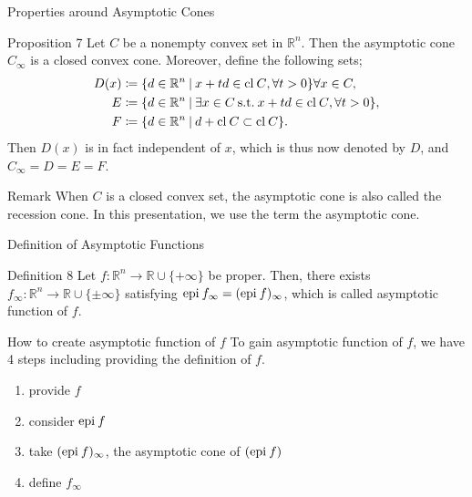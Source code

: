 \documentclass[aspectratio=169, dvipdfmx, 11pt]{beamer}
\newcommand{\RealNumberSet}{\mathbb{R}}
\newcommand{\NDemenstionalRealEuclideanSpace}{\mathbb{R}^n}
\newcommand{\Closure}[1]{\text{\rm cl\:${#1}$}} %
\newcommand{\Epigraph}[1]{\text{\rm epi\:${#1}$}} %
\newcommand{\SuchThat}{\:\text{s.t.}\:}
\newcommand{\SetForm}[2]{
  \{{#1}\:|\:{#2}\}
}
\begin{document}
\begin{frame}{Properties around Asymptotic Cones}
  \begin{block}{Proposition 7}
    Let $C$ be a nonempty convex set in $\NDemenstionalRealEuclideanSpace$. Then the asymptotic cone $C_{\infty}$ is a closed convex cone. Moreover, define the following sets;
    \begin{align}
      D(x) &\coloneqq \SetForm{d \in \NDemenstionalRealEuclideanSpace}{x+td \in \Closure{C}, \forall t > 0} \forall x \in C, \notag \\
      E &\coloneqq \SetForm{d \in \NDemenstionalRealEuclideanSpace}{\exists x \in C \SuchThat x+td \in \Closure{C}, \forall t > 0}, \notag \\
      F &\coloneqq \SetForm{d \in \NDemenstionalRealEuclideanSpace}{d + \Closure{C} \subset \Closure{C}}. \notag
    \end{align}
    Then $D(x)$ is in fact independent of $x$, which is thus now denoted by $D$, and $C_{\infty} = D = E = F$.
  \end{block}

  \begin{alertblock}{Remark}
    When $C$ is a closed convex set, the asymptotic cone is also called the recession cone. In this presentation, we use the term the asymptotic cone.
  \end{alertblock}
\end{frame}

\begin{frame}{Definition of Asymptotic Functions}
  \begin{block}{Definition 8}
    Let $f: \NDemenstionalRealEuclideanSpace \rightarrow \RealNumberSet \cup \{+\infty\}$ be proper. Then, there exists $f_{\infty}: \NDemenstionalRealEuclideanSpace \rightarrow \RealNumberSet \cup \{\pm\infty\}$ satisfying $\Epigraph{f_{\infty}} = (\Epigraph{f})_{\infty}$, which is called asymptotic function of $f$.
  \end{block}

  \pause
  \begin{exampleblock}{How to create asymptotic function of $f$}
    To gain asymptotic function of $f$, we have 4 steps including providing the definition of $f$.
    \begin{enumerate}
      \item provide $f$
      \item consider $\Epigraph{f}$
      \item take $(\Epigraph{f})_{\infty}$, the asymptotic cone of $(\Epigraph{f})$
      \item define $f_{\infty}$
    \end{enumerate}
  \end{exampleblock}
\end{frame}
\end{document}
